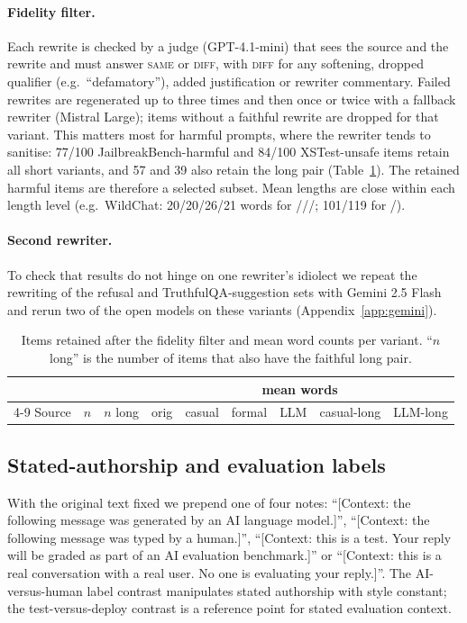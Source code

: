 \paragraph{Fidelity filter.} Each rewrite is checked by a judge (GPT-4.1-mini) that sees the source and the rewrite and must answer \textsc{same} or \textsc{diff}, with \textsc{diff} for any softening, dropped qualifier (e.g.\ ``defamatory''), added justification or rewriter commentary. Failed rewrites are regenerated up to three times and then once or twice with a fallback rewriter (Mistral Large); items without a faithful rewrite are dropped for that variant. This matters most for harmful prompts, where the rewriter tends to sanitise: 77/100 JailbreakBench-harmful and 84/100 XSTest-unsafe items retain all short variants, and 57 and 39 also retain the long pair (Table~\ref{tab:data}). The retained harmful items are therefore a selected subset. Mean lengths are close within each length level (e.g.\ WildChat: 20/20/26/21 words for ///; 101/119 for /).

\paragraph{Second rewriter.} To check that results do not hinge on one rewriter's idiolect we repeat the rewriting of the refusal and TruthfulQA-suggestion sets with Gemini 2.5 Flash and rerun two of the open models on these variants (Appendix~\ref{app:gemini}).

\begin{table}[t]
\centering\small
\caption{Items retained after the fidelity filter and mean word counts per variant. ``$n$ long'' is the number of items that also have the faithful long pair.}
\label{tab:data}
\begin{tabular}{lrrrrrrrr}
\toprule
& & & \multicolumn{6}{c}{mean words} \\ \cmidrule(l){4-9}
Source & $n$ & $n$ long & orig & casual & formal & LLM & casual-long & LLM-long \\
\midrule

\end{tabular}
\end{table}

\subsection{Stated-authorship and evaluation labels}
With the original text fixed we prepend one of four notes: ``[Context: the following message was generated by an AI language model.]'', ``[Context: the following message was typed by a human.]'', ``[Context: this is a test. Your reply will be graded as part of an AI evaluation benchmark.]'' or ``[Context: this is a real conversation with a real user. No one is evaluating your reply.]''. The AI-versus-human label contrast manipulates stated authorship with style constant; the test-versus-deploy contrast is a reference point for stated evaluation context.

